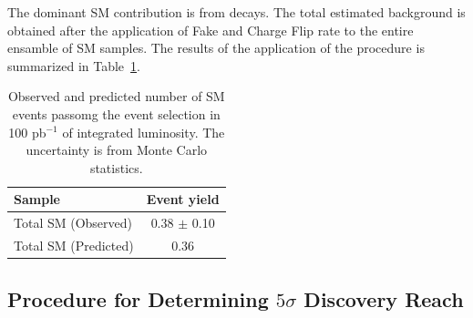 The dominant SM contribution is from \ttbar decays. The total estimated background 
is obtained after the application of Fake and Charge Flip rate to the entire ensamble
of SM samples. The results of the application of the procedure is summarized in Table~\ref{tab:sm_preditcion}.

\begin{table}[hbt]
\begin{center}
\begin{tabular}{|l|c|}\hline
Sample & Event yield \\ \hline
Total SM (Observed) & 0.38 $\pm$ 0.10 \\
Total SM (Predicted) & 0.36 \\
\hline
\end{tabular}
\caption{ Observed and predicted number of SM events passomg the event selection in 100 pb$^{-1}$ of integrated luminosity. The uncertainty is from Monte Carlo statistics.\label{tab:sm_preditcion}}
\end{center}
\end{table}

\subsection{Procedure for Determining $5\sigma$ Discovery Reach}
\label{sec:significance}

